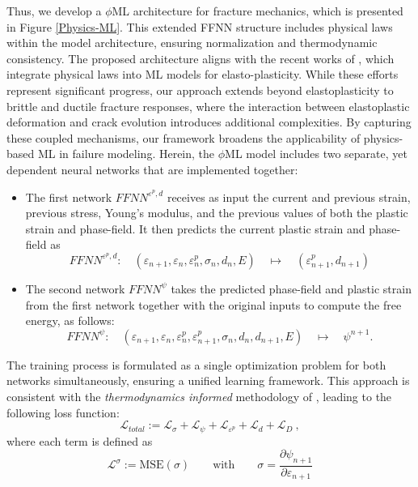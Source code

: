 \documentclass[final,3p,times]{elsarticle}
\begin{document}
Thus, we develop a $\phi$ML architecture for fracture mechanics, which is presented in Figure \ref{Physics-ML}. This extended FFNN structure includes physical laws within the model architecture, ensuring normalization and thermodynamic consistency. The proposed architecture aligns with the recent works of \cite{masi2021thermodynamics,rosenkranz2023}, which integrate physical laws into ML models for elasto-plasticity. While these efforts represent significant progress, our approach extends beyond elastoplasticity to brittle and ductile fracture responses, where the interaction between elastoplastic deformation and crack evolution introduces additional complexities. By capturing these coupled mechanisms, our framework broadens the applicability of physics-based ML in failure modeling. Herein, the $\phi$ML model includes two separate, yet dependent neural networks that are implemented together: 
\begin{itemize}
    \item The first network $FFNN^{\varepsilon^p, d}$ receives as input the current and previous strain, previous stress, Young's modulus, and the previous values of both the plastic strain and phase-field. It then predicts the current plastic strain and phase-field as   
%
\begin{equation}
    FFNN^{\varepsilon^p, d} :\quad  
    (\varepsilon_{n+1}, \varepsilon_n, \varepsilon^p_n, \sigma_n, d_n, E)  
    \quad \longmapsto \quad  
    (\varepsilon^p_{n+1}, d_{n+1})
\end{equation}
\item The second network $FFNN^\psi$ takes the predicted phase-field and plastic strain from the first network together with the original inputs to compute the free energy, as follows:
\begin{equation}
    FFNN^{\psi} :\quad  
    (\varepsilon_{n+1}, \varepsilon_n, \varepsilon^p_n, \varepsilon^p_{n+1}, \sigma_n, d_n, d_{n+1}, E)  
    \quad \longmapsto \quad  
    \psi^{n+1}.
\end{equation}
%
\end{itemize}
The training process is formulated as a single optimization problem for both networks simultaneously, ensuring a unified learning framework. This approach is consistent with the \emph{thermodynamics informed} methodology of \cite{masi2021thermodynamics}, leading to the following loss function:
\begin{equation}
    \mathcal{L}_{total}:= \mathcal{L}_{\sigma} + \mathcal{L}_{\psi} + \mathcal{L}_{\varepsilon^p} + \mathcal{L}_d + \mathcal{L}_{D} \ ,
\end{equation}
where each term is defined as
\begin{equation}
    \mathcal{L}^\sigma := \text{MSE}(\sigma) \qquad \text{with} \qquad \sigma = \frac{\partial \psi_{n+1}}{\partial \varepsilon_{n+1}}
\end{equation}
\end{document}
